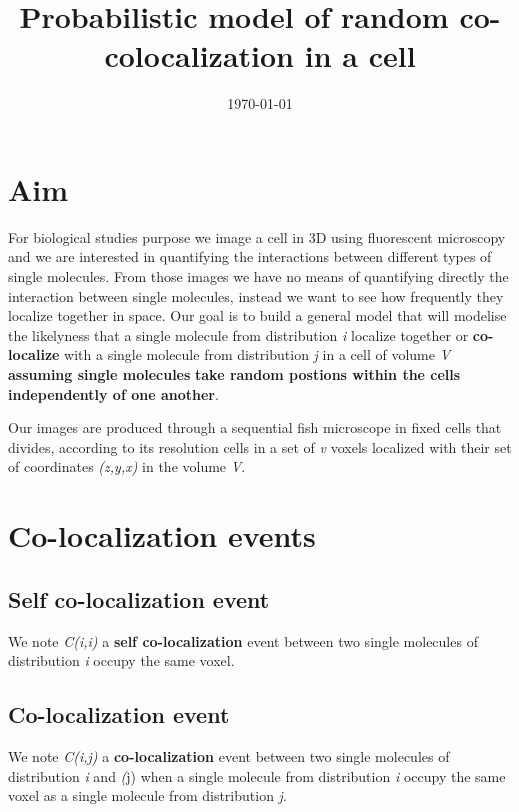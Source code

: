 \documentclass{article}  %
\title{Probabilistic model of random co-colocalization in a cell}  %
\author{}      %
\date{\today}           %
\begin{document}

\maketitle              %

\section{Aim}  %
For biological studies purpose we image a cell in 3D using fluorescent microscopy and we are interested in quantifying the 
interactions between different types of single molecules. From those images we have no means of quantifying directly the interaction
between single molecules, instead we want to see how frequently they localize together in space. Our goal is to build a general model
that will modelise the likelyness that a single molecule from distribution \textit{i} localize together or \textbf{co-localize} with
a single molecule from distribution \textit{j} in a cell of volume \textit{V} \textbf{assuming single molecules} 
\textbf{take random postions within the cells independently of one another}.

Our images are produced through a sequential fish microscope in fixed cells that divides, according to its resolution cells in a set of
\textit{v} voxels localized with their set of coordinates \textit{(z,y,x)} in the volume \textit{V}. 

\section{Co-localization events}
\subsection{Self co-localization event}
We note \textit{C(i,i)} a \textbf{self co-localization} event between two single molecules of distribution \textit{i} occupy the same
voxel.

\subsection{Co-localization event}
We note \textit{C(i,j)} a \textbf{co-localization} event between two single molecules of distribution \textit{i} and \textit(j)
when a single molecule from distribution \textit{i} occupy the same voxel as a single molecule from distribution \textit{j}.
\end{document}

